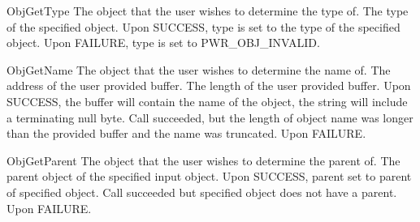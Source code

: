 \begin{prototype}{ObjGetType}
		{\pInput}	{The object that the user wishes to determine the type of.}
		{\pOutput}	{The type of the specified object.}
	 	{ Upon SUCCESS, type is set to the type of the specified object.}
	 	{ Upon FAILURE, type is set to PWR_OBJ_INVALID.}
\end{prototype}
\begin{prototype}{ObjGetName}
		{\pInput}	{The object that the user wishes to determine the name of.}
	    	{\pInput}	{The address of the user provided buffer.}
	    	{\pInput}	{The length of the user provided buffer.}
	 	{Upon SUCCESS, the buffer will contain the name of the object, the string will include a terminating null byte.}	
	 	{Call succeeded, but the length of object name was longer than the provided buffer and the name was truncated.}
	 	{Upon FAILURE.}
\end{prototype}
\begin{prototype}{ObjGetParent}
	 {\pInput} 		{The object that the user wishes to determine the parent of.}
			{The parent object of the specified input object.}
	        		{Upon SUCCESS, parent set to parent of specified object.}
	 		{Call succeeded but specified object does not have a parent.}
	        		{Upon FAILURE.}
\end{prototype}

